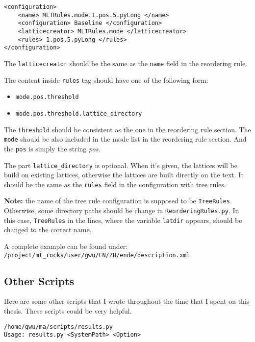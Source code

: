 \begin{Verbatim}[frame=single]
<configuration>
    <name> MLTRules.mode.1.pos.5.pyLong </name>
    <configuration> Baseline </configuration>
    <latticecreator> MLTRules.mode </latticecreator>
    <rules> 1.pos.5.pyLong </rules>
</configuration>
\end{Verbatim}
The \verb|latticecreator| should be the same as the \verb|name| field in the reordering rule. 

The content inside \verb|rules| tag should have one of the following form:
\begin{itemize}
  \setlength{\itemsep}{0cm}%
  \setlength{\parskip}{0cm}%
  \item \verb|mode.pos.threshold| 
  \item \verb|mode.pos.threshold.lattice_directory|
\end{itemize}

The \verb|threshold| should be consistent as the one in the reordering rule section. The \verb|mode| should be also included in the mode list in the reordering rule section. And the \verb|pos| is simply the string \emph{pos}.

The part \verb|lattice_directory| is optional. When it's given, the lattices will be build on existing lattices, otherwise the lattices are built directly on the text. It should be the same as the \verb|rules| field in the configuration with tree rules. 


\label{note}\textbf{Note:} the name of the tree rule configuration is supposed to be \verb|TreeRules|. Otherwise, some directory paths should be change in \verb|ReorderingRules.py|. In this case, \verb|TreeRules| in the lines, where the variable \verb|latdir| appears, should be changed to the correct name.


A complete example can be found under:\\
\verb|/project/mt_rocks/user/gwu/EN/ZH/ende/description.xml|

\subsection{Other Scripts}

Here are some other scripts that I wrote throughout the time that I spent on this thesis. These scripts could be very helpful.

\verb|/home/gwu/ma/scripts/results.py|\\
\verb|Usage: results.py <SystemPath> <Option>|

